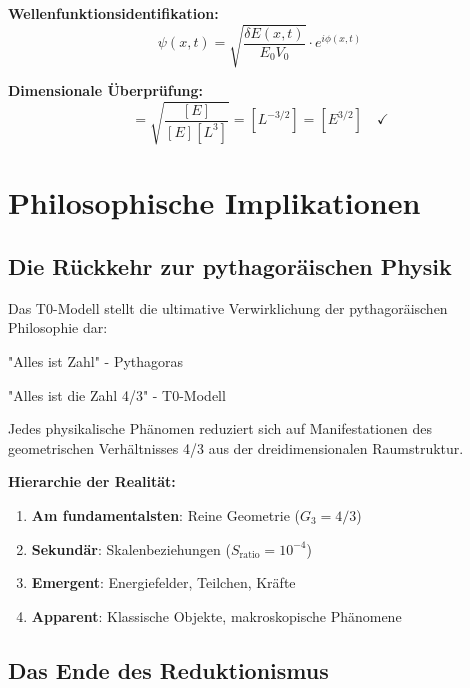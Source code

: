 \documentclass[12pt,a4paper]{report}
\begin{document}
	\textbf{Wellenfunktionsidentifikation:}
	\begin{equation}
		\psi(x,t) = \sqrt{\frac{\delta E(x,t)}{E_0 V_0}} \cdot e^{i\phi(x,t)}
	\end{equation}
	
	\textbf{Dimensionale Überprüfung:}
	\begin{equation}
		[\psi] = \sqrt{\frac{[E]}{[E][L^3]}} = [L^{-3/2}] = [E^{3/2}] \quad \checkmark
	\end{equation}
	
	\section{Philosophische Implikationen}
	\label{sec:philosophical_implications}
	
	\subsection{Die Rückkehr zur pythagoräischen Physik}
	\label{subsec:pythagorean_physics}
	
	Das T0-Modell stellt die ultimative Verwirklichung der pythagoräischen Philosophie dar:
	
	\begin{tcolorbox}[colback=blue!5!white,colframe=blue!75!black,title=Pythagoräische Einsicht verwirklicht]
		"Alles ist Zahl" - Pythagoras
		
		"Alles ist die Zahl 4/3" - T0-Modell
		
		Jedes physikalische Phänomen reduziert sich auf Manifestationen des geometrischen Verhältnisses 4/3 aus der dreidimensionalen Raumstruktur.
	\end{tcolorbox}
	
	\textbf{Hierarchie der Realität:}
	\begin{enumerate}
		\item \textbf{Am fundamentalsten}: Reine Geometrie ($G_3 = 4/3$)
		\item \textbf{Sekundär}: Skalenbeziehungen ($S_{\text{ratio}} = 10^{-4}$)
		\item \textbf{Emergent}: Energiefelder, Teilchen, Kräfte
		\item \textbf{Apparent}: Klassische Objekte, makroskopische Phänomene
	\end{enumerate}
	
	\subsection{Das Ende des Reduktionismus}
	\label{subsec:end_reductionism}
	
\end{document}
